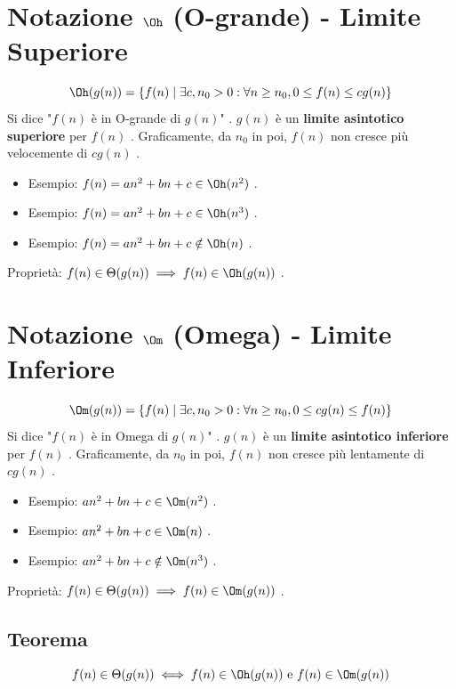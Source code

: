 \section{Notazione $\Oh$ (O-grande) - Limite Superiore }
\begin{definition}
$$ \Oh(g(n)) = \{ f(n) \mid \exists c, n_0 > 0 : \forall n \ge n_0, 0 \le f(n) \le c g(n) \} $$
Si dice "$f(n)$ è in O-grande di $g(n)$" .
$g(n)$ è un \textbf{limite asintotico superiore} per $f(n)$ .
Graficamente, da $n_0$ in poi, $f(n)$ non cresce più velocemente di $c g(n)$ .
\begin{itemize}
    \item Esempio: $f(n) = an^2 + bn + c \in \Oh(n^2)$ .
    \item Esempio: $f(n) = an^2 + bn + c \in \Oh(n^3)$ .
    \item Esempio: $f(n) = an^2 + bn + c \notin \Oh(n)$ .
\end{itemize}
Proprietà: $f(n) \in \Theta(g(n)) \implies f(n) \in \Oh(g(n))$ .
\end{definition}

\section{Notazione $\Om$ (Omega) - Limite Inferiore }
\begin{definition}
$$ \Om(g(n)) = \{ f(n) \mid \exists c, n_0 > 0 : \forall n \ge n_0, 0 \le c g(n) \le f(n) \} $$
Si dice "$f(n)$ è in Omega di $g(n)$" .
$g(n)$ è un \textbf{limite asintotico inferiore} per $f(n)$ .
Graficamente, da $n_0$ in poi, $f(n)$ non cresce più lentamente di $c g(n)$ .
\begin{itemize}
    \item Esempio: $an^2 + bn + c \in \Om(n^2)$ .
    \item Esempio: $an^2 + bn + c \in \Om(n)$ .
    \item Esempio: $an^2 + bn + c \notin \Om(n^3)$ .
\end{itemize}
Proprietà: $f(n) \in \Theta(g(n)) \implies f(n) \in \Om(g(n))$ .
\end{definition}

\subsection{Teorema}
\begin{theorem}
$$ f(n) \in \Theta(g(n)) \iff f(n) \in \Oh(g(n)) \text{ e } f(n) \in \Om(g(n)) $$
\end{theorem}

